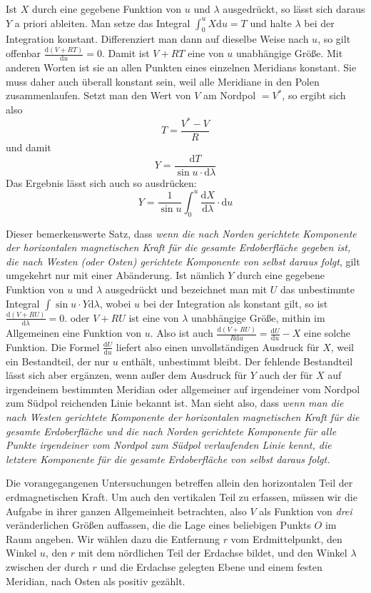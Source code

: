 Ist $X$ durch eine gegebene Funktion von $u$ und $\lambda$ ausgedrückt, so lässt sich daraus $Y$ a priori ableiten. Man setze das Integral $\int_0^u X\mathrm{d}u=T$ und halte $\lambda$ bei der Integration konstant. Differenziert man dann auf dieselbe Weise nach $u$, so gilt offenbar $\frac{\mathrm{d}(V+RT)}{\mathrm{d}u}=0$. Damit ist $V+RT$ eine von $u$ unabhängige Größe. Mit anderen Worten ist sie an allen Punkten eines einzelnen Meridians konstant. Sie muss daher auch überall konstant sein, weil alle Meridiane in den Polen zusammenlaufen. Setzt man den Wert von $V$ am Nordpol $=V^*$, so ergibt sich also
\[
T=\frac{V^*-V}{R}
\]
und damit
\[
Y=\frac{\mathrm{d}T}{\sin u\cdot\mathrm{d}\lambda}
\]
Das Ergebnis lässt sich auch so ausdrücken:
\[
Y=\frac{1}{\sin u}\int_0^u\frac{\mathrm{d}X}{\mathrm{d}\lambda}\cdot\mathrm{d}u
\]

Dieser bemerkenswerte Satz, dass \textit{wenn die nach Norden gerichtete Komponente der horizontalen magnetischen Kraft für die gesamte Erdoberfläche gegeben ist, die nach Westen (oder Osten) gerichtete Komponente von selbst daraus folgt}, gilt umgekehrt nur mit einer Abänderung. Ist nämlich $Y$ durch eine gegebene Funktion von $u$ und $\lambda$ ausgedrückt und bezeichnet man mit $U$ das unbestimmte Integral $\int\sin u\cdot Y\mathrm{d}\lambda$, wobei $u$ bei der Integration als konstant gilt, so ist $\frac{\mathrm{d}(V+RU)}{\mathrm{d}\lambda}=0$. oder $V+RU$ ist eine von $\lambda$ unabhängige Größe, mithin im Allgemeinen eine Funktion von $u$. Also ist auch $\frac{\mathrm{d}(V+RU)}{R\mathrm{d}u}=\frac{\mathrm{d}U}{\mathrm{d}u}-X$ eine solche Funktion. Die Formel $\frac{\mathrm{d}U}{\mathrm{d}u}$ liefert also einen unvollständigen Ausdruck für $X$, weil ein Bestandteil, der nur $u$ enthält, unbestimmt bleibt. Der fehlende Bestandteil lässt sich aber ergänzen, wenn außer dem Ausdruck für $Y$ auch der für $X$ auf irgendeinem bestimmten Meridian oder allgemeiner auf irgendeiner vom Nordpol zum Südpol reichenden Linie bekannt ist. Man sieht also, dass \textit{wenn man die nach Westen gerichtete Komponente der horizontalen magnetischen Kraft für die gesamte Erdoberfläche und die nach Norden gerichtete Komponente für alle Punkte irgendeiner vom Nordpol zum Südpol verlaufenden Linie kennt, die letztere Komponente für die gesamte Erdoberfläche von selbst daraus folgt.}

Die vorangegangenen Untersuchungen betreffen allein den horizontalen Teil der erdmagnetischen Kraft. Um auch den vertikalen Teil zu erfassen, müssen wir die Aufgabe in ihrer ganzen Allgemeinheit betrachten, also $V$ als Funktion von \textit{drei} veränderlichen Größen auffassen, die die Lage eines beliebigen Punkts $O$ im Raum angeben. Wir wählen dazu die Entfernung $r$ vom Erdmittelpunkt, den Winkel $u$, den $r$ mit dem nördlichen Teil der Erdachse bildet, und den Winkel $\lambda$ zwischen der durch $r$ und die Erdachse gelegten Ebene und einem festen Meridian, nach Osten als positiv gezählt.

